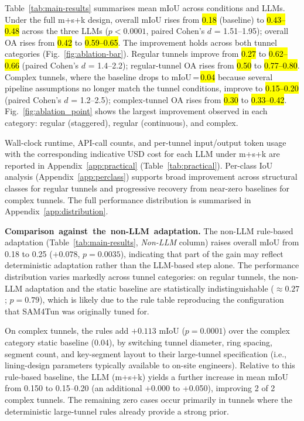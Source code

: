 \documentclass[a4paper,fleqn]{cas-dc}
\begin{document}
{Table~\ref{tab:main-results} summarises mean mIoU across conditions and LLMs. Under the full m+s+k design, overall mIoU rises from \hl{0.18} (baseline) to \hl{0.43--0.48} across the three LLMs ($p < 0.0001$, paired Cohen's \mbox{$d$} = 1.51--1.95); overall OA rises from \hl{0.42} to \hl{0.59--0.65}. The improvement holds across both tunnel categories (Fig.~\ref{fig:ablation-bar}). Regular tunnels improve from \hl{0.27} to \hl{0.62--0.66} (paired Cohen's \mbox{$d$} = 1.4--2.2); regular-tunnel OA rises from \hl{0.50} to \hl{0.77--0.80}. Complex tunnels, where the baseline drops to mIoU\,=\,\hl{0.04} because several pipeline assumptions no longer match the tunnel conditions, improve to \hl{0.15--0.20} (paired Cohen's \mbox{$d$} = 1.2--2.5); complex-tunnel OA rises from \hl{0.30} to \hl{0.33--0.42}. Fig.~\ref{fig:ablation_point} shows the largest improvement observed in each category: regular (staggered), regular (continuous), and complex.

Wall-clock runtime, API-call counts, and per-tunnel input/output token usage with the corresponding indicative USD cost for each LLM under m+s+k are reported in Appendix~\ref{app:practical} (Table~\ref{tab:practical}). Per-class IoU analysis (Appendix~\ref{app:perclass}) supports broad improvement across structural classes for regular tunnels and progressive recovery from near-zero baselines for complex tunnels. The full performance distribution is summarised in Appendix~\ref{app:distribution}. 



\mbox{\textbf{Comparison against the non-LLM adaptation.}} The non-LLM rule-based adaptation (Table~\mbox{\ref{tab:main-results}}, \mbox{\emph{Non-LLM}} column) raises overall mIoU from 0.18 to 0.25 ($+0.078$, $p = 0.0035$), indicating that part of the gain may reflect deterministic adaptation rather than the LLM-based step alone. The performance distribution varies markedly across tunnel categories: on regular tunnels, the non-LLM adaptation and the static baseline are statistically indistinguishable ($\approx 0.27$; $p = 0.79$), which is likely due to the rule table reproducing the configuration that SAM4Tun was originally tuned for.

On complex tunnels, the rules add $+0.113$ mIoU ($p = 0.0001$) over the complex category static baseline (0.04), by switching tunnel diameter, ring spacing, segment count, and key-segment layout to their large-tunnel specification (i.e., lining-design parameters typically available to on-site engineers). Relative to this rule-based baseline, the LLM (m+s+k) yields a further increase in mean mIoU from 0.150 to 0.15--0.20 (an additional +0.000 to +0.050), improving 2 of 2 complex tunnels. The remaining zero cases occur primarily in tunnels where the deterministic large-tunnel rules already provide a strong prior.

}
\end{document}
